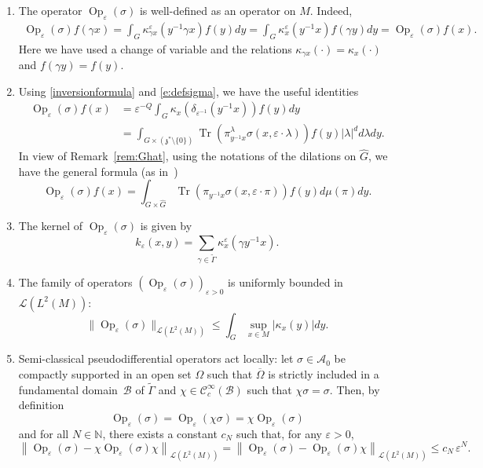 \documentclass[JEP,XML,SOM,Unicode,published]{cedram}
\let\mathcal\mathscr
\DeclareMathOperator{\Op}{Op}
\DeclareMathOperator{\Tr}{Tr}
\theoremstyle{plain}
\theoremstyle{definition}
\let\eps\varepsilon
\def\N{{\mathbb N}}
\begin{document}
\begin{enumerate}
\item\label{fact:1}
The operator $\Op_\eps(\sigma)$ is well-defined as an operator on $M$. Indeed,
\begin{align*}
\Op_\eps(\sigma) f(\gamma x)
= \int_{ G} \kappa_{\gamma x}^\eps(y^{-1} \gamma x) f(y)dy
= \int_{ G} \kappa_{x}^\eps(y^{-1} x) f(\gamma y)dy
= \Op_\eps(\sigma) f(x).
\end{align*}
Here we have used a change of variable and the relations $\kappa_{\gamma x}(\cdot)=\kappa_x(\cdot)$ and $f(\gamma y)=f(y)$.

\item\label{fact:2}
Using \eqref{inversionformula} and \eqref{e:defsigma}, we have the useful identities
\begin{align*}
\Op_\eps(\sigma)f(x)
&=\eps^{-Q} \int_{ G} \kappa_x(\delta_{\eps^{-1}}(y^{-1} x)) f(y)dy
\\
&= \int_{G\times \left(\mathfrak z^*\setminus \{0\}\right)} \Tr (\pi^\lambda_{y^{-1} x} \sigma(x,\eps\cdot \lambda)) f(y) |\lambda|^d d\lambda dy.
\end{align*}
In view of Remark~\ref{rem:Ghat}, using the notations of the dilations on $\widehat G$, we have the general formula (as in~\cite[Rem.\,3.3]{FF1})
\[
\Op_\eps(\sigma)f(x)
= \int_{G\times \widehat G} \Tr (\pi_{y^{-1} x} \sigma(x,\eps\cdot \pi)) f(y) d\mu(\pi) dy.
\]

\item\label{fact:3}
The kernel of $\Op_\eps(\sigma)$ is given by
\[
k_\eps(x,y) = \sum_{\gamma\in \widetilde{\Gamma}} \kappa_{ x}^\eps(\gamma y^{-1} x).
\]
\item\label{fact:4} The family of operators $\left(\Op_\eps(\sigma)\right)_{\eps >0}$ is uniformly bounded in ${\mathcal L}(L^2(M))$:
\begin{equation}\label{eq:boundedness}
\| \Op_\eps (\sigma)\|_{\mathcal L(L^2(M))} \leq \int_{G} \sup_{x\in M} |\kappa_x(y)|dy.
\end{equation}
\item\label{fact:5} Semi-classical pseudodifferential operators act locally: let $\sigma\in{\mathcal A}_0$ be compactly supported in an open set $\Omega$ such that $\overline \Omega$ is strictly included in a fundamental domain~$\mathcal B$ of $\widetilde{\Gamma}$ and $\chi\in \mathcal C^\infty_c(\mathcal B)$ such that $\chi \sigma=\sigma$. Then, by definition
\[
\Op_\eps(\sigma)=\Op_\eps(\chi \sigma) =\chi \Op_\eps(\sigma)
\]
and for all $N\in \N$, there exists a constant $c_N$ such that, for any $\eps>0$,
\begin{equation}\label{eq:localisation}
\left\| \Op_\eps(\sigma) - \chi \Op_\eps(\sigma) \chi \right\| _{ \mathcal L(L^2(M))}=
\left\| \Op_\eps(\sigma) - \Op_\eps(\sigma) \chi \right\| _{ \mathcal L(L^2(M))}
\leq c_N \,\eps^N.
\end{equation}
\end{enumerate}
\end{document}
